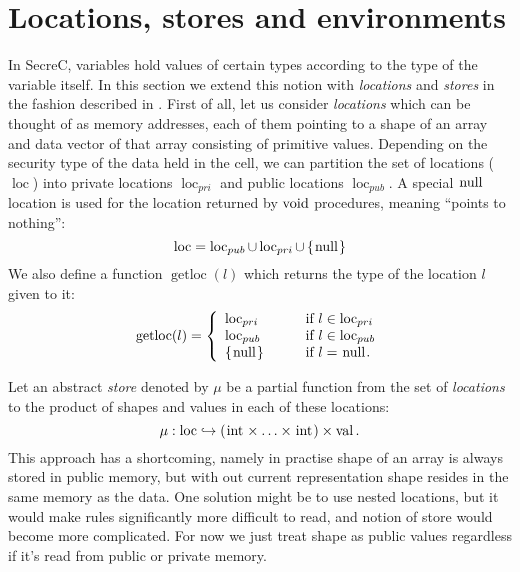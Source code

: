 \documentclass[a4paper, 10pt, draft]{report}
\newcommand{\mycode}[1]{\ensuremath{\mbox{\lstinline{#1}}}}
\begin{document}
\section{Locations, stores and environments}\label{sec:semantics:stores}

In SecreC, variables hold values of certain types according to the type of the
variable itself. In this section we extend this notion with \textit{locations}
and \textit{stores} in the fashion described in \cite{PLOTKIN, NIELSON}. First
of all, let us consider \textit{locations} which can be thought of as memory
addresses, each of them pointing to a shape of an array and data vector of that
array consisting of primitive values. Depending on the security type of the
data held in the cell, we can partition the set of locations
($\operatorname{loc}$) into private locations $\operatorname{loc}_{pri}$ and
public locations $\operatorname{loc}_{pub}$. A special \mycode{null} location
is used for the location returned by \mycode{void} procedures, meaning ``points
to nothing'':
\[
  \operatorname{loc} = \operatorname{loc}_{pub} \cup \operatorname{loc}_{pri} \cup \left\{\mycode{null}\right\}
\]
We also define a function $\operatorname{getloc}\!\left(l\right)$ which returns
the type of the location $l$ given to it: \[
  \operatorname{getloc}\!\left(l\right) = \left\{
    \begin{array}{ll}
      \operatorname{loc}_{pri}     & \qquad\mbox{if}\ l \in \operatorname{loc}_{pri} \\
      \operatorname{loc}_{pub}     & \qquad\mbox{if}\ l \in \operatorname{loc}_{pub} \\
      \left\{\mycode{null}\right\} & \qquad\mbox{if}\ l = \mycode{null}. \\
    \end{array}\right.
\]

Let an abstract \textit{store} denoted by $\mu$ be a partial function from the
set of \textit{locations} to the product of shapes and values in each of these
locations:
\[
\mu : \operatorname{loc} \hookrightarrow ( \mycode{int} \times \ldots \times \mycode{int} ) \times \operatorname{val} .
\]
This approach has a shortcoming, namely in practise shape of an array is always
stored in public memory, but with out current representation shape resides in
the same memory as the data. One solution might be to use nested locations, but
it would make rules significantly more difficult to read, and notion of store
would become more complicated. For now we just treat shape as public values
regardless if it's read from public or private memory.
\end{document}
